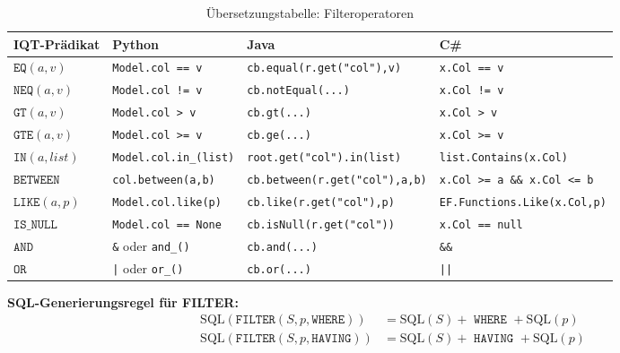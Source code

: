 \begin{table}
\centering
\caption{Übersetzungstabelle: Filteroperatoren}
\label{tab:filter_ops}
\renewcommand{\arraystretch}{1.4}
\begin{tabularx}{\textwidth}{lXXX}
\toprule
\textbf{IQT-Prädikat} & \textbf{Python} & \textbf{Java} & \textbf{C\#} \\
\midrule
$\mathtt{EQ}(a, v)$
  & \texttt{Model.col == v}
  & \texttt{cb.equal(r.get("col"),v)}
  & \texttt{x.Col == v} \\
$\mathtt{NEQ}(a, v)$
  & \texttt{Model.col != v}
  & \texttt{cb.notEqual(...)}
  & \texttt{x.Col != v} \\
$\mathtt{GT}(a, v)$
  & \texttt{Model.col > v}
  & \texttt{cb.gt(...)}
  & \texttt{x.Col > v} \\
$\mathtt{GTE}(a, v)$
  & \texttt{Model.col >= v}
  & \texttt{cb.ge(...)}
  & \texttt{x.Col >= v} \\
$\mathtt{IN}(a, list)$
  & \texttt{Model.col.in\_(list)}
  & \texttt{root.get("col").in(list)}
  & \texttt{list.Contains(x.Col)} \\
$\mathtt{BETWEEN}$
  & \texttt{col.between(a,b)}
  & \texttt{cb.between(r.get("col"),a,b)}
  & \texttt{x.Col >= a \&\& x.Col <= b} \\
$\mathtt{LIKE}(a, p)$
  & \texttt{Model.col.like(p)}
  & \texttt{cb.like(r.get("col"),p)}
  & \texttt{EF.Functions.Like(x.Col,p)} \\
$\mathtt{IS\_NULL}$
  & \texttt{Model.col == None}
  & \texttt{cb.isNull(r.get("col"))}
  & \texttt{x.Col == null} \\
$\mathtt{AND}$
  & \texttt{\&} oder \texttt{and\_()}
  & \texttt{cb.and(...)}
  & \texttt{\&\&} \\
$\mathtt{OR}$
  & \texttt{|} oder \texttt{or\_()}
  & \texttt{cb.or(...)}
  & \texttt{||} \\
\bottomrule
\end{tabularx}
\end{table}

\textbf{SQL-Generierungsregel für FILTER:}
\begin{align*}
\mathrm{SQL}(\mathtt{FILTER}(S, p, \mathtt{WHERE}))
  &= \mathrm{SQL}(S) + \texttt{ WHERE } + \mathrm{SQL}(p) \\
\mathrm{SQL}(\mathtt{FILTER}(S, p, \mathtt{HAVING}))
  &= \mathrm{SQL}(S) + \texttt{ HAVING } + \mathrm{SQL}(p)
\end{align*}

